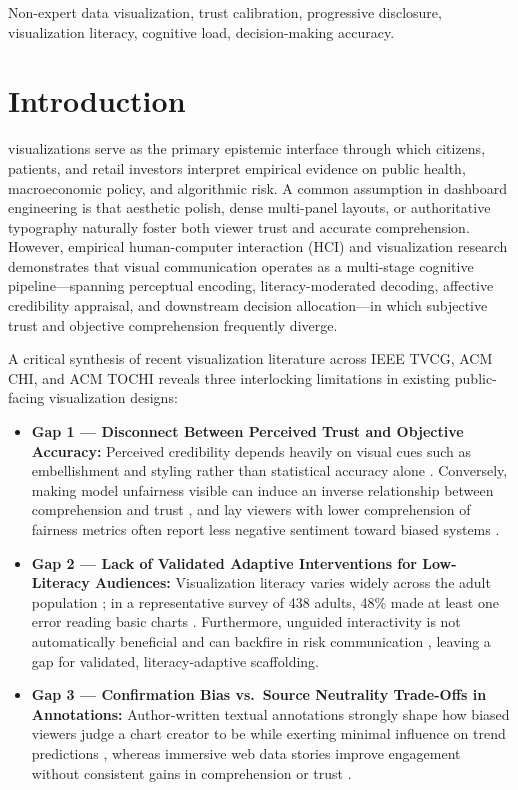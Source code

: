 \documentclass[conference]{IEEEtran}
\begin{document}
\begin{IEEEkeywords}
Non-expert data visualization, trust calibration, progressive disclosure, visualization literacy, cognitive load, decision-making accuracy.
\end{IEEEkeywords}

\section{Introduction}
 visualizations serve as the primary epistemic interface through which citizens, patients, and retail investors interpret empirical evidence on public health, macroeconomic policy, and algorithmic risk. A common assumption in dashboard engineering is that aesthetic polish, dense multi-panel layouts, or authoritative typography naturally foster both viewer trust and accurate comprehension. However, empirical human-computer interaction (HCI) and visualization research demonstrates that visual communication operates as a multi-stage cognitive pipeline---spanning perceptual encoding, literacy-moderated decoding, affective credibility appraisal, and downstream decision allocation---in which subjective trust and objective comprehension frequently diverge.

A critical synthesis of recent visualization literature across IEEE TVCG, ACM CHI, and ACM TOCHI reveals three interlocking limitations in existing public-facing visualization designs:

\begin{itemize}
\item \textbf{Gap 1 --- Disconnect Between Perceived Trust and Objective Accuracy:} Perceived credibility depends heavily on visual cues such as embellishment and styling rather than statistical accuracy alone \cite{song2026,elhamdadi2024}. Conversely, making model unfairness visible can induce an inverse relationship between comprehension and trust \cite{kaufman2026}, and lay viewers with lower comprehension of fairness metrics often report less negative sentiment toward biased systems \cite{saha2020}.
\item \textbf{Gap 2 --- Lack of Validated Adaptive Interventions for Low-Literacy Audiences:} Visualization literacy varies widely across the adult population \cite{pandey2023,cui2024}; in a representative survey of 438 adults, 48\% made at least one error reading basic charts \cite{saske2024}. Furthermore, unguided interactivity is not automatically beneficial and can backfire in risk communication \cite{zikmund2011}, leaving a gap for validated, literacy-adaptive scaffolding.
\item \textbf{Gap 3 --- Confirmation Bias vs.\ Source Neutrality Trade-Offs in Annotations:} Author-written textual annotations strongly shape how biased viewers judge a chart creator to be while exerting minimal influence on trend predictions \cite{stokes2024}, whereas immersive web data stories improve engagement without consistent gains in comprehension or trust \cite{kim2024}.
\end{itemize}
\end{document}
